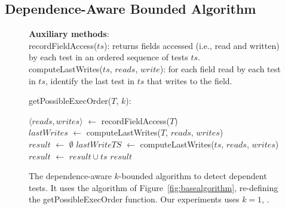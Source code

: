 \subsection{Dependence-Aware Bounded Algorithm}
\label{sec:advalgorithm}

\begin{figure}[t]
\textbf{Auxiliary methods}:\\
recordFieldAccess($ts$): returns fields accessed (i.e., read and written) by each test in an ordered sequence of tests $ts$. \\
computeLastWrites($ts$, $reads$, $write$): for each field read by each test in $ts$, identify the last test in $ts$ that writes to the field.\\

\vspace{-2mm}

getPossibleExecOrder($T$, $k$):\\
\vspace{-5mm}
\begin{algorithmic}[1]
\STATE $\langle reads, writes\rangle$ $\leftarrow$ recordFieldAccess($T$)\\
\STATE $\mathit{lastWrites}$ $\leftarrow$ computeLastWrites($T$, $\mathit{reads}$, $\mathit{writes}$)
\\
\STATE $\mathit{result}$ $\leftarrow$ $\emptyset$
\STATE $\mathit{lastWriteTS}$ $\leftarrow$ computeLastWrites($ts$, $\mathit{reads}$, $\mathit{writes}$)
\vspace{-3mm}
\STATE $\mathit{result}$ $\leftarrow$ $\mathit{result} \cup \mathit{ts}$
\ENDIF
\ENDFOR
\RETURN $\mathit{result}$
\end{algorithmic}

\vspace{-3mm}
\caption {The dependence-aware $k$-bounded algorithm to detect dependent tests.
It uses the algorithm of Figure~\ref{fig:basealgorithm}, re-defining the
getPossibleExecOrder function.
Our experiments uses $k=1$, . } 
\label{fig:impralg}
\end{figure}

